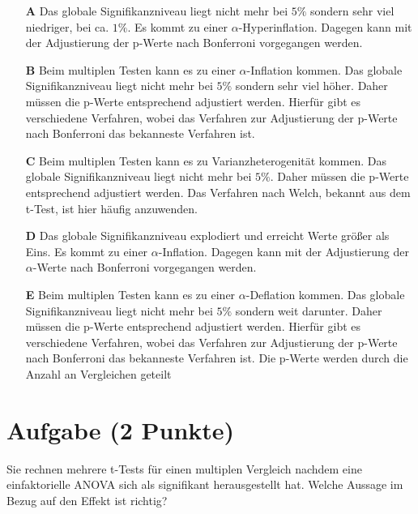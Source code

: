 \documentclass[a4paper, 9pt]{scrartcl}\usepackage[]{graphicx}\usepackage[]{xcolor}
\begin{document}
\begin{enumerate}
\item [\textbf{A} \msquare] Das globale Signifikanzniveau liegt nicht mehr bei $5\%$ sondern sehr viel niedriger, bei ca. $1\%$. Es kommt zu einer $\alpha$-Hyperinflation. Dagegen kann mit der Adjustierung der p-Werte nach Bonferroni vorgegangen werden.
\item [\textbf{B} \msquare] Beim multiplen Testen kann es zu einer $\alpha$-Inflation kommen. Das globale Signifikanzniveau liegt nicht mehr bei $5\%$ sondern sehr viel höher. Daher müssen die p-Werte entsprechend adjustiert werden. Hierfür gibt es verschiedene Verfahren, wobei das Verfahren zur Adjustierung der p-Werte nach Bonferroni das bekanneste Verfahren ist.
\item [\textbf{C} \msquare] Beim multiplen Testen kann es zu Varianzheterogenität kommen. Das globale Signifikanzniveau liegt nicht mehr bei $5\%$. Daher müssen die p-Werte entsprechend adjustiert werden. Das Verfahren nach Welch, bekannt aus dem t-Test, ist hier häufig anzuwenden.
\item [\textbf{D} \msquare] Das globale Signifikanzniveau explodiert und erreicht Werte größer als Eins. Es kommt zu einer $\alpha$-Inflation. Dagegen kann mit der Adjustierung der $\alpha$-Werte nach Bonferroni vorgegangen werden.
\item [\textbf{E} \msquare] Beim multiplen Testen kann es zu einer $\alpha$-Deflation kommen. Das globale Signifikanzniveau liegt nicht mehr bei $5\%$ sondern weit darunter. Daher müssen die p-Werte entsprechend adjustiert werden. Hierfür gibt es verschiedene Verfahren, wobei das Verfahren zur Adjustierung der p-Werte nach Bonferroni das bekanneste Verfahren ist. Die p-Werte werden durch die Anzahl an Vergleichen geteilt
\end{enumerate}

\section{Aufgabe \hfill (2 Punkte)}




Sie rechnen mehrere t-Tests für einen multiplen Vergleich nachdem eine einfaktorielle ANOVA sich als signifikant herausgestellt hat. Welche Aussage im Bezug auf den Effekt ist richtig? 
\end{document}
